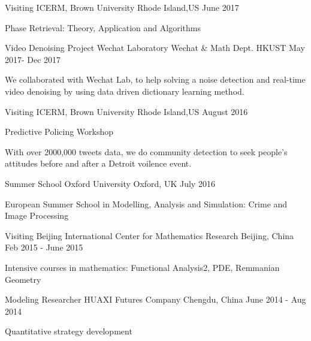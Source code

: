 \begin{cventries}
  \cventry
    {Visiting}
    {ICERM, Brown University}
    {Rhode Island,US}
    {June 2017}
    {
      \begin{cvitems}
        \item {Phase Retrieval: Theory, Application and Algorithms}
      \end{cvitems}
    }
  \cventry
    {Video Denoising Project}
    {Wechat Laboratory}
    {Wechat \& Math Dept. HKUST}
    {May 2017- Dec 2017}
    {
      \begin{cvitems}
        \item {We collaborated with Wechat Lab, to help solving a noise detection and real-time video denoising by using data driven dictionary learning method.}
      \end{cvitems}
    }
  \cventry
    {Visiting}
    {ICERM, Brown University}
    {Rhode Island,US}
    {August 2016}
    {
      \begin{cvitems}
        \item {Predictive Policing Workshop}
        \item {With over 2000,000 tweets data, we do community detection to seek people's attitudes before and after a Detroit voilence event.}
      \end{cvitems} 
    }
  \cventry
    {Summer School}
    {Oxford University}
    {Oxford, UK}
    {July 2016}
    {
      \begin{cvitems}
        \item {European Summer School in Modelling, Analysis and Simulation: Crime and Image Processing}
      \end{cvitems}
    }
  \cventry
    {Visiting}
    {Beijing International Center for Mathematics Research}
    {Beijing, China}
    {Feb 2015 - June 2015}
    {
      \begin{cvitems}
        \item {Intensive courses in mathematics: Functional Analysis2, PDE, Remmanian Geometry}
      \end{cvitems}
    }
  \cventry
    {Modeling Researcher}
    {HUAXI Futures Company}
    {Chengdu, China}
    {June 2014 - Aug 2014}
    {
      \begin{cvitems}
        \item {Quantitative strategy development}
      \end{cvitems}
    }
\end{cventries}
